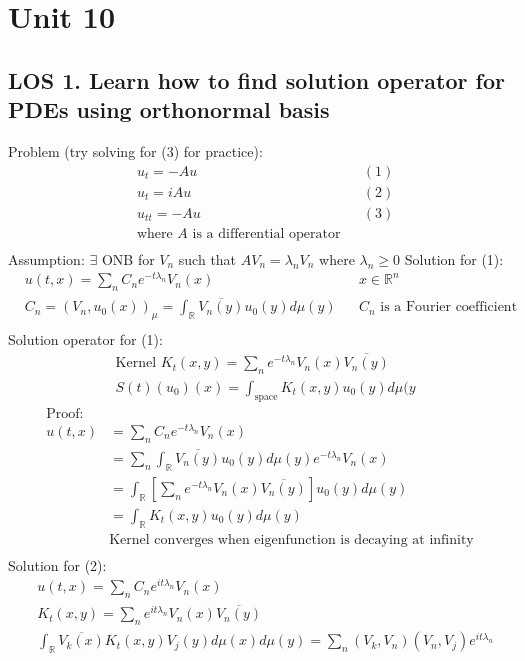 \documentclass[12pt, a4paper]{article}
\begin{document}
\section*{Unit 10}
\vspace{1em}

\subsection*{LOS 1. Learn how to find solution operator for PDEs using orthonormal basis}
Problem (try solving for (3) for practice):
\begin{align*}
    &u_t = -Au &&(1)\\
    &u_t = iAu &&(2)\\
    &u_{tt} = -Au &&(3)\\
    &\text{where $A$ is a differential operator}\\
\end{align*}
Assumption: $\exists$ ONB for $V_n$ such that $AV_n = \lambda_nV_n$ where $\lambda_n\geq 0$
Solution for (1):
\begin{align*}
    &u(t, x) = \sum_n C_ne^{-t\lambda_n}V_n(x)&&x\in \mathbb{R}^n\\
    &C_n = (V_n, u_0(x))_\mu = \int_\mathbb{R}\overline{V_n(y)}u_0(y)d\mu(y)&&C_n \text{ is a Fourier coefficient}\\
\end{align*}
Solution operator for (1):
\begin{align*}
    &\text{Kernel }K_t(x, y)  = \sum_ne^{-t\lambda_n}V_n(x)\overline{V_n(y)}\\
    &S(t)(u_0)(x) = \int_\text{space}K_t(x, y)u_0(y)d\mu(y
\end{align*}
\begin{align*}
    \text{Proof:}\\
    u(t, x) &= \sum_n C_ne^{-t\lambda_n}V_n(x)\\
    & = \sum_n\int_\mathbb{R}\overline{V_n(y)}u_0(y)d\mu(y)e^{-t\lambda_n}V_n(x)\\
    & = \int_\mathbb{R}\left[\sum_ne^{-t\lambda_n}V_n(x)\overline{V_n(y)}\right]u_0(y)d\mu(y)\\
    &=\int_\mathbb{R}K_t(x, y)u_0(y)d\mu(y)\\
    &\text{Kernel converges when eigenfunction is decaying at infinity}\\
\end{align*}
Solution for (2):
\begin{align*}
    &u(t, x) = \sum_n C_ne^{it\lambda_n}V_n(x)\\
    &K_t(x, y)  = \sum_ne^{it\lambda_n}V_n(x)\overline{V_n(y)}\\
    &\int_\mathbb{R}\overline{V_k(x)}K_t(x, y)V_j(y)d\mu(x)d\mu(y) = \sum_n(V_k,V_n)(V_n,V_j)e^{it\lambda_n}
\end{align*}
\vspace{0.3em}
\end{document}
